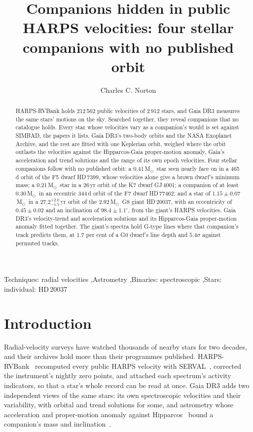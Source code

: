 \documentclass[3p,11pt]{elsarticle}
\newcommand{\Msun}{M$_\odot$}
\begin{document}
\begin{frontmatter}

\title{Companions hidden in public HARPS velocities: four stellar companions with no published orbit}

\author{Charles C. Norton}

\begin{abstract}
HARPS-RVBank holds 212\,562 public velocities of 2\,912 stars, and Gaia DR3 measures the same
stars' motions on the sky. Searched together, they reveal companions that no catalogue holds. Every
star whose velocities vary as a companion's would is set against SIMBAD, the papers it lists, Gaia
DR3's two-body orbits and the NASA Exoplanet Archive, and the rest are fitted with one Keplerian
orbit, weighed where the orbit outlasts the velocities against the Hipparcos-Gaia proper-motion
anomaly, Gaia's acceleration and trend solutions and the range of its own epoch velocities. Four
stellar companions follow with no published orbit: a 0.41\,\Msun\ star seen nearly face on in a
465\,d orbit of the F5 dwarf HD\,7399, whose velocities alone give a brown dwarf's minimum mass; a
0.21\,\Msun\ star in a 26\,yr orbit of the K7 dwarf GJ\,4001; a companion of at least
0.30\,\Msun\ in an eccentric 344\,d orbit of the F7 dwarf HD\,77462; and a star of
$1.15 \pm 0.07$\,\Msun\ in a $27.2^{+2.0}_{-1.5}$\,yr orbit of the 2.92\,\Msun\ G8 giant
HD\,20037, with an eccentricity of $0.45 \pm 0.02$ and an inclination of $98.4 \pm 1.1^\circ$, from
the giant's HARPS velocities, Gaia DR3's velocity-trend and acceleration solutions and its
Hipparcos-Gaia proper-motion anomaly fitted together. The giant's spectra hold G-type lines where
that companion's track predicts them, at 1.7 per cent of a G0 dwarf's line depth and $5.4\sigma$
against permuted tracks.
\end{abstract}

\begin{keyword}
Techniques: radial velocities \sep Astrometry \sep Binaries: spectroscopic \sep Stars: individual: HD\,20037
\end{keyword}

\end{frontmatter}

\section{Introduction}\label{sec:intro}

Radial-velocity surveys have watched thousands of nearby stars for two decades, and their
archives hold more than their programmes published. HARPS-RVBank~\cite{Trifonov2020} recomputed
every public HARPS velocity with SERVAL~\cite{Zechmeister2018}, corrected the instrument's
nightly zero points, and attached each spectrum's activity indicators, so that a star's whole
record can be read at once. Gaia DR3 adds two independent views of the same stars: its own
spectroscopic velocities and their variability, with orbital and trend solutions for some, and
astrometry whose acceleration and proper-motion anomaly against Hipparcos~\cite{Kervella2022} bound
a companion's mass and inclination~\cite{GaiaNSS2023}.
\end{document}
